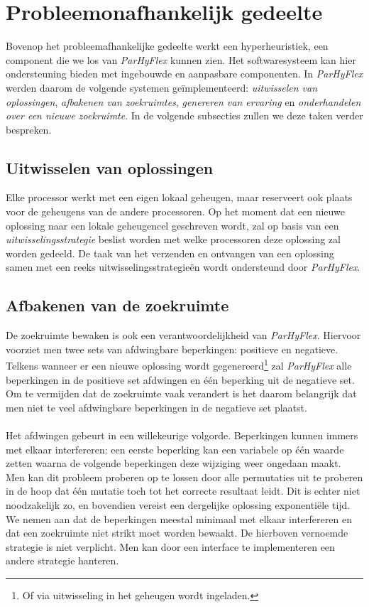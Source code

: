 \section{Probleemonafhankelijk gedeelte}

Bovenop het probleemafhankelijke gedeelte werkt een hyperheuristiek, een component die we los van \emph{ParHyFlex} kunnen zien. Het softwaresysteem kan hier ondersteuning bieden met ingebouwde en aanpasbare componenten.  In \emph{ParHyFlex} werden daarom de volgende systemen ge\"implementeerd: \emph{uitwisselen van oplossingen}, \emph{afbakenen van zoekruimtes}, \emph{genereren van ervaring} en \emph{onderhandelen over een nieuwe zoekruimte}. In de volgende subsecties zullen we deze taken verder bespreken.

\subsection{Uitwisselen van oplossingen}

Elke processor werkt met een eigen lokaal geheugen, maar reserveert ook plaats voor de geheugens van de andere processoren. Op het moment dat een nieuwe oplossing naar een lokale geheugencel geschreven wordt, zal op basis van een \emph{uitwisselingsstrategie} beslist worden met welke processoren deze oplossing zal worden gedeeld. De taak van het verzenden en ontvangen van een oplossing samen met een reeks uitwisselingsstrategie\"en wordt ondersteund door \emph{ParHyFlex}.

\subsection{Afbakenen van de zoekruimte}
 
De zoekruimte bewaken is ook een verantwoordelijkheid van \emph{ParHyFlex}. Hiervoor voorziet men twee sets van afdwingbare beperkingen: positieve en negatieve. Telkens wanneer er een nieuwe oplossing wordt gegenereerd\footnote{Of via uitwisseling in het geheugen wordt ingeladen.} zal \emph{ParHyFlex} alle beperkingen in de positieve set afdwingen en \'e\'en beperking uit de negatieve set. Om te vermijden dat de zoekruimte vaak verandert is het daarom belangrijk dat men niet te veel afdwingbare beperkingen in de negatieve set plaatst.

\paragraph{}
Het afdwingen gebeurt in een willekeurige volgorde. Beperkingen kunnen immers met elkaar interfereren: een eerste beperking kan een variabele op \'e\'en waarde zetten waarna de volgende beperkingen deze wijziging weer ongedaan maakt. Men kan dit probleem proberen op te lossen door alle permutaties uit te proberen in de hoop dat \'e\'en mutatie toch tot het correcte resultaat leidt. Dit is echter niet noodzakelijk zo, en bovendien vereist een dergelijke oplossing exponenti\"ele tijd. We nemen aan dat de beperkingen meestal minimaal met elkaar interfereren en dat een zoekruimte niet strikt moet worden bewaakt. De hierboven vernoemde strategie is niet verplicht. Men kan door een interface te implementeren een andere strategie hanteren.


